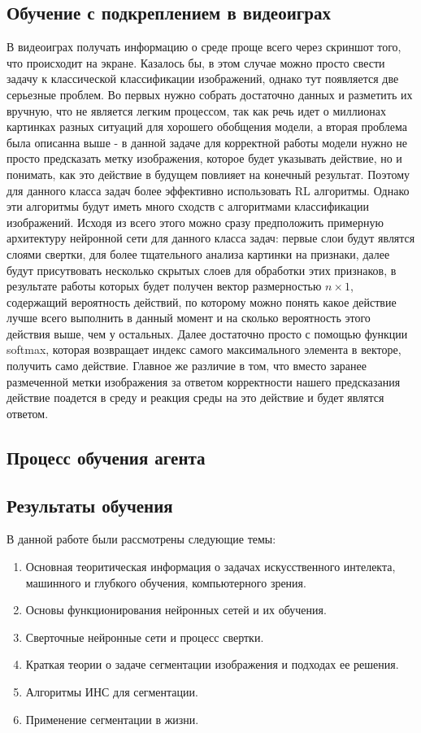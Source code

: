 \documentclass[bachelor, och, coursework]{shiza}
\begin{document}
\subsection{Обучение с подкреплением в видеоиграх}
В видеоиграх получать информацию о среде проще всего через скриншот того, что происходит на экране. Казалось бы, в этом случае можно просто свести 
задачу к классической классификации изображений, однако тут появляется две серьезные проблем. Во первых нужно собрать достаточно данных и разметить
их вручную, что не является легким процессом, так как речь идет о миллионах картинках разных ситуаций для хорошего обобщения модели, а вторая проблема
была описанна выше - в данной задаче для корректной работы модели нужно не просто предсказать метку изображения, которое будет указывать действие, но
и понимать, как это действие в будущем повлияет на конечный результат. Поэтому для данного класса задач более эффективно использовать RL алгоритмы.
Однако эти алгоритмы будут иметь много сходств с алгоритмами классификации изображений. Исходя из всего этого можно сразу предположить примерную архитектуру
нейронной сети для данного класса задач: первые слои будут являтся слоями свертки, для более тщательного анализа картинки на признаки, далее будут присутвовать
несколько скрытых слоев для обработки этих признаков, в результате работы которых будет получен вектор размерностью $n \times 1$, содержащий вероятность действий,
по которому можно понять какое действие лучше всего выполнить в данный момент и на сколько вероятность этого действия выше, чем у остальных. Далее достаточно просто
с помощью функции softmax, которая возвращает индекс самого максимального элемента в векторе, получить само действие. Главное же различие в том, что вместо заранее
размеченной метки изображения за ответом корректности нашего предсказания действие поадется в среду и реакция среды на это действие и будет являтся ответом.
\subsection{Процесс обучения агента}
\subsection{Результаты обучения}

\newpage
\conclusion %

В данной работе были рассмотрены следующие темы:

\begin{enumerate}
    \item Основная теоритическая информация о задачах искусственного интелекта, машинного и глубкого обучения, компьютерного зрения.
    \item Основы функционирования нейронных сетей и их обучения.
    \item Сверточные нейронные сети и процесс свертки.
    \item Краткая теории о задаче сегментации изображения и подходах ее решения.
    \item Алгоритмы ИНС для сегментации.
    \item Применение сегментации в жизни.
\end{enumerate}
\end{document}
